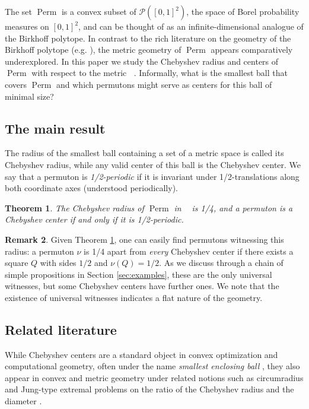 \documentclass{article}
\newcommand{\Perm}{\mathop{\mathrm{Perm}}}
\newcommand{\ds}{\mathop{d_\square}}
\newtheorem{theorem}{Theorem}[section]
\theoremstyle{definition}
\newtheorem{remark}[theorem]{Remark}
\begin{document}
The set $\Perm$ is a convex subset of $\mathcal{P}([0, 1]^2)$, the space of Borel probability measures on $[0, 1]^2$, and can be thought of as an infinite-dimensional analogue of the Birkhoff polytope. In contrast to the rich literature on the geometry of the Birkhoff polytope (e.g. \cite{BRUALDI1977194, Beck2003, Bouthat2025, Bouthat2025_2}), the metric geometry of $\Perm$ appears comparatively underexplored. In this paper we study the Chebyshev radius and centers of $\Perm$ with respect to the metric $\ds$. Informally, what is the smallest ball that covers $\Perm$ and which permutons might serve as centers for this ball of minimal size? 

\subsection{The main result}

The radius of the smallest ball containing a set of a metric space is called its Chebyshev radius, while any valid center of this ball is the Chebyshev center. We say that a permuton is \emph{1/2-periodic} if it is invariant under 1/2-translations along both coordinate axes (understood periodically).

\begin{theorem} \label{thm:main}
    The Chebyshev radius of $\Perm$ in $\ds$ is 1/4, and a permuton is a Chebyshev center if and only if it is 1/2-periodic.
\end{theorem}


\begin{remark} \label{remark:witnesses}
    Given Theorem \ref{thm:main}, one can easily find permutons witnessing this radius: a permuton $\nu$ is 1/4 apart from \emph{every} Chebyshev center if there exists a square $Q$ with sides $1/2$ and $\nu(Q)=1/2$. As we discuss through a chain of simple propositions in Section \ref{sec:examples}, these are the only universal witnesses, but some Chebyshev centers have further ones. We note that the existence of universal witnesses indicates a flat nature of the geometry.
\end{remark}

\subsection{Related literature}

While Chebyshev centers are a standard object in convex optimization and computational geometry, often under the name \emph{smallest enclosing ball} \cite{PAN200649, Mordukhovich2013}, they also appear in convex and metric geometry under related notions such as circumradius and Jung-type extremal problems on the ratio of the Chebyshev radius and the diameter \cite{Jung1901, Dekster1995}.
\end{document}
